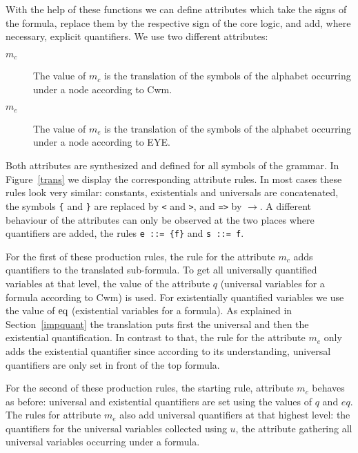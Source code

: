 With the help of these functions we can define attributes which take the signs of the \nthree formula, 
replace them by the respective sign of the core logic,
and add, where necessary, explicit quantifiers.  We use two different attributes:
\begin{description}
 \item[$m_c$] The value of $m_c$ is the translation of the symbols of the alphabet occurring under a node according to Cwm. 
  \item[$m_e$] The value of $m_e$ is the translation of the symbols of the alphabet occurring under a node according to EYE.
\end{description}
Both attributes are synthesized and defined for all symbols of the grammar. In Figure~\ref{trans} we display the corresponding attribute rules. In most cases these 
rules look very similar: constants, existentials and universals are concatenated, the symbols \texttt{\{} and \texttt{\}} are replaced by \texttt{<} and \texttt{>}, and \texttt{=>}
by $\rightarrow$. 
A different behaviour of the attributes can only be observed at the two places where quantifiers are added, the rules \texttt{e~::=~\{f\}} and \texttt{s~::=~f}.

For the first of these production rules, the rule for the attribute $m_c$ adds quantifiers to the translated sub-formula. 
To get all universally quantified variables at that level, the value of the attribute $q$ (universal variables for a formula according to 
Cwm) is used. 
For existentially quantified variables  we use the value of $\text{eq}$ (existential variables for a formula).
As explained in Section~\ref{impquant} the translation puts first the universal and then the existential quantification.
In contrast to that, the rule for the attribute $m_e$ only adds the existential quantifier since according to its understanding, 
universal quantifiers are only set in front of the top formula. 

For the second of these production rules, the starting rule, attribute $m_c$ behaves as before: universal and existential quantifiers are set using the values of $q$ and $eq$. 
The rules for attribute $m_e$ also add universal quantifiers at that highest level: the quantifiers for the universal variables collected using $u$, the attribute gathering 
all universal variables occurring under a formula. 


